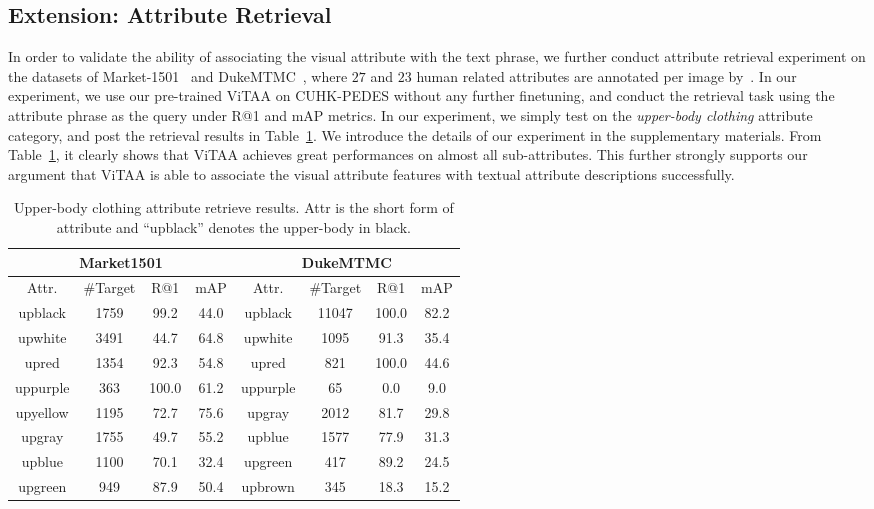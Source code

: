 \documentclass[runningheads]{llncs}
\begin{document}
\subsection{Extension: Attribute Retrieval}
In order to validate the ability of associating the visual attribute with the text phrase, we further conduct attribute retrieval experiment on the datasets of Market-1501~\cite{zheng2015scalable} and DukeMTMC~\cite{ristani2016performance}, where $27$ and $23$ human related attributes are annotated per image by~\cite{lin2019improving}. In our experiment, we use our pre-trained ViTAA on CUHK-PEDES without any further finetuning, and conduct the retrieval task using the attribute phrase as the query under R@1 and mAP metrics. In our experiment, we simply test on the \emph{upper-body clothing} attribute category, and post the retrieval results in Table~\ref{tab:attr_retrieve}. We introduce the details of our experiment in the supplementary materials. From Table~\ref{tab:attr_retrieve}, it clearly shows that ViTAA achieves great performances on almost all sub-attributes. This further strongly supports our argument that ViTAA is able to associate the visual attribute features with textual attribute descriptions successfully.


\begin{table}[t]
\caption{Upper-body clothing attribute retrieve results. Attr is the short form of attribute and ``upblack'' denotes the upper-body in black.}
\begin{center}
\setlength{\tabcolsep}{7.5pt}
{
\begin{tabular}{c|c|cc|c|c|cc}
\toprule[1pt]
\multicolumn{4}{c|}{Market1501} &\multicolumn{4}{c}{DukeMTMC} \\
\hline
Attr. &\#Target &R@1 &mAP &Attr. &\#Target &R@1 &mAP \\
\hline
upblack &1759 &99.2 &44.0 &upblack &11047 &100.0 &82.2 \\
upwhite &3491 &44.7 &64.8 &upwhite &1095 &91.3 &35.4 \\
upred &1354 &92.3 &54.8 &upred &821 &100.0 &44.6 \\
uppurple &363 &100.0 &61.2 &uppurple &65 &0.0 &9.0 \\
upyellow &1195 &72.7 &75.6 &upgray &2012 &81.7 &29.8 \\
upgray &1755 &49.7 &55.2 &upblue &1577 &77.9 &31.3 \\
upblue &1100 &70.1 &32.4 &upgreen &417 &89.2 &24.5 \\
upgreen &949 &87.9 &50.4 &upbrown &345 &18.3 &15.2 \\
\bottomrule[1pt]
\end{tabular}
}
\end{center}
\label{tab:attr_retrieve}
\end{table}
\end{document}
